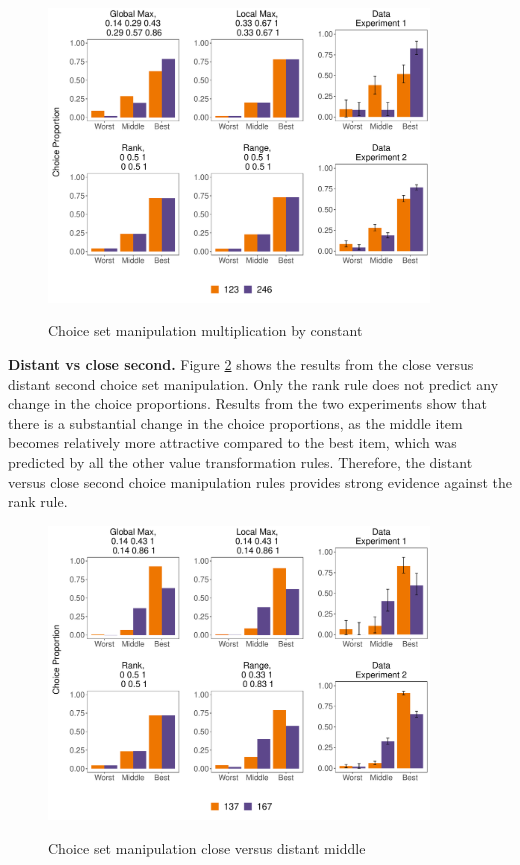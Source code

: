 \documentclass[11pt,a4paper]{article}
\begin{document}
\begin{figure}[!htb]
\captionsetup{justification=centering}
\centering
\caption{Choice set manipulation multiplication by constant}
\includegraphics[width=0.9\textwidth]{multiply.pdf}
\label{fig:multiply_all}
\end{figure}

\textbf{Distant vs close second.} Figure \ref{fig:distclose2nd_all} shows the results from the close versus distant second choice set manipulation. Only the rank rule does not predict any change in the choice proportions. Results from the two experiments show that there is a substantial change in the choice proportions, as the middle item becomes relatively more attractive compared to the best item, which was predicted by all the other value transformation rules. Therefore, the distant versus close second choice manipulation rules provides strong evidence against the rank rule. 


\begin{figure}[!htb]
\captionsetup{justification=centering}
\centering
\caption{Choice set manipulation close versus distant middle}
\includegraphics[width=0.9\textwidth]{closedistsec.pdf}
\label{fig:distclose2nd_all}
\end{figure}
\end{document}
